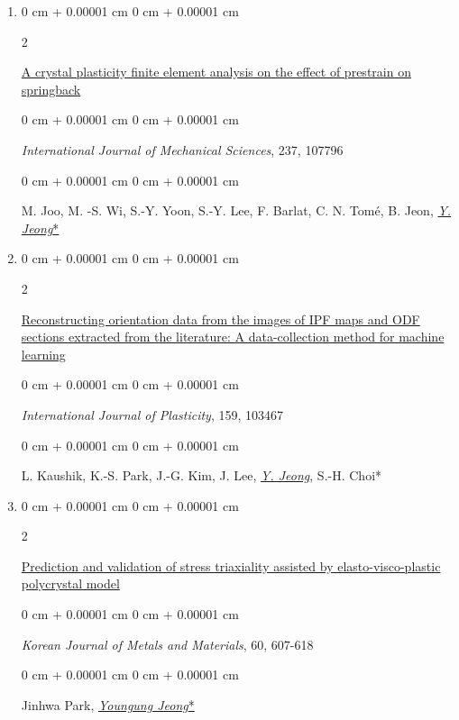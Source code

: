 \documentclass[10pt, letterpaper]{article}
\newenvironment{onecolentry}{
    \begin{adjustwidth}{
        0 cm + 0.00001 cm
    }{
        0 cm + 0.00001 cm
    }
}{
    \end{adjustwidth}
} %
\newenvironment{twocolentry}[2][]{
    \onecolentry
    \def\secondColumn{#2}
    \setcolumnwidth{\fill, 4.5 cm}
    \begin{paracol}{2}
}{
    \switchcolumn \raggedleft \secondColumn
    \end{paracol}
    \endonecolentry
} %
\begin{document}
\begin{enumerate}
        \item
        \begin{twocolentry}{2023}
            \href{https://doi.org/10.1016/j.ijmecsci.2022.107796}{A crystal plasticity finite element analysis on the effect of prestrain on springback}
        \end{twocolentry}
        \begin{onecolentry}
            {\it International Journal of Mechanical Sciences}, 237, 107796
        \end{onecolentry}
        \begin{onecolentry}
            M. Joo, M. -S. Wi, S.-Y. Yoon, S.-Y. Lee, F. Barlat, C. N. Tomé, B. Jeon, {\underline{\textit{Y. Jeong}*}}
        \end{onecolentry}
        \vspace{0.10 cm}


        \item
        \begin{twocolentry}{2023}
            \href{https://doi.org/10.1016/j.ijplas.2022.103467}{Reconstructing orientation data from the images of IPF maps and ODF sections extracted from the literature: A data-collection method for machine learning}
        \end{twocolentry}
        \begin{onecolentry}
            {\it International Journal of Plasticity}, 159, 103467
        \end{onecolentry}
        \begin{onecolentry}
            L. Kaushik, K.-S. Park, J.-G. Kim, J. Lee, {\underline{\textit{Y. Jeong}}}, S.-H. Choi*
        \end{onecolentry}
        \vspace{0.10 cm}


        \item
        \begin{twocolentry}{2022}
            \href{http://dx.doi.org/10.3365/KJMM.2022.60.8.607}{Prediction and validation of stress triaxiality assisted by elasto-visco-plastic polycrystal model}
        \end{twocolentry}
        \begin{onecolentry}
            {\it Korean Journal of Metals and Materials}, 60, 607-618
        \end{onecolentry}
        \begin{onecolentry}
            Jinhwa Park, {\underline{\textit{Youngung Jeong}*}}
        \end{onecolentry}
        \vspace{0.10 cm}


\end{enumerate}
\end{document}
